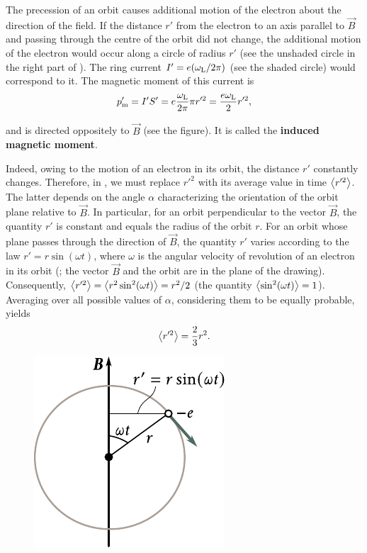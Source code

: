 The precession of an orbit causes additional motion of the electron about the direction of the field.
If the distance $r'$ from the electron to an axis parallel to $\vec{B}$ and passing through the centre of the orbit did not change, the additional motion of the electron would occur along a circle of radius $r'$ (see the unshaded circle in the right part of ).
The ring current $I' = e (\omega_{\text{L}}/2\pi)$ (see the shaded circle) would correspond to it.
The magnetic moment of this current is
\begin{equation}\label{eq:7_47}
    p_{\text{m}}' = I' S' = e \frac{\omega_{\text{L}}}{2\pi} \pi r'^2 = \frac{e\omega_{\text{L}}}{2} r'^2,
\end{equation}

\noindent
and is directed oppositely to $\vec{B}$ (see the figure). It is called the \textbf{induced magnetic moment}.

Indeed, owing to the motion of an electron in its orbit, the distance $r'$ constantly changes.
Therefore, in , we must replace $r'^2$ with its average value in time $\left\langle r'^2 \right\rangle$.
The latter depends on the angle $\alpha$ characterizing the orientation of the orbit plane relative to $\vec{B}$.
In particular, for an orbit perpendicular to the vector $\vec{B}$, the quantity $r'$ is constant and equals the radius of the orbit $r$.
For an orbit whose plane passes through the direction of $\vec{B}$, the quantity $r'$ varies according to the law $r' = r\sin(\omega t)$, where $\omega$ is the angular velocity of revolution of an electron in its orbit (; the vector $\vec{B}$ and the orbit are in the plane of the drawing).
Consequently, $\left\langle r'^2 \right\rangle=\left\langle r^2\sin^2(\omega t) \right\rangle = r^2/2$ (the quantity $\left\langle \sin^2(\omega t) \right\rangle=1$).
Averaging over all possible values of $\alpha$, considering them to be equally probable, yields
\begin{equation}\label{eq:7_48}
    \left\langle r'^2 \right\rangle = \frac{2}{3} r^2.
\end{equation}

\begin{figure}[t]
	\begin{center}
		\includegraphics[scale=1]{figures/ch_07/fig_7_15.pdf}
		\caption[]{}
		\label{fig:7_15}
	\end{center}
	\vspace{-0.8cm}
\end{figure}

